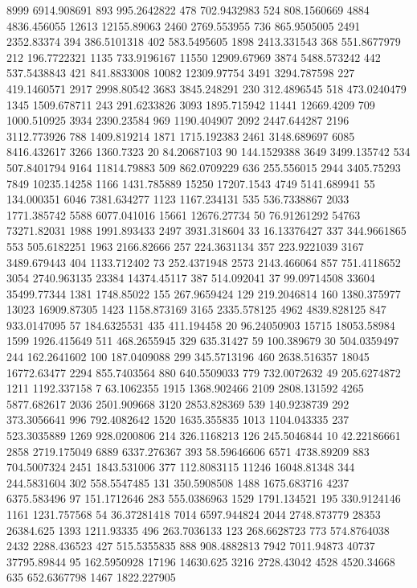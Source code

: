 8999	6914.908691
893	995.2642822
478	702.9432983
524	808.1560669
4884	4836.456055
12613	12155.89063
2460	2769.553955
736	865.9505005
2491	2352.83374
394	386.5101318
402	583.5495605
1898	2413.331543
368	551.8677979
212	196.7722321
1135	733.9196167
11550	12909.67969
3874	5488.573242
442	537.5438843
421	841.8833008
10082	12309.97754
3491	3294.787598
227	419.1460571
2917	2998.80542
3683	3845.248291
230	312.4896545
518	473.0240479
1345	1509.678711
243	291.6233826
3093	1895.715942
11441	12669.4209
709	1000.510925
3934	2390.23584
969	1190.404907
2092	2447.644287
2196	3112.773926
788	1409.819214
1871	1715.192383
2461	3148.689697
6085	8416.432617
3266	1360.7323
20	84.20687103
90	144.1529388
3649	3499.135742
534	507.8401794
9164	11814.79883
509	862.0709229
636	255.556015
2944	3405.75293
7849	10235.14258
1166	1431.785889
15250	17207.1543
4749	5141.689941
55	134.000351
6046	7381.634277
1123	1167.234131
535	536.7338867
2033	1771.385742
5588	6077.041016
15661	12676.27734
50	76.91261292
54763	73271.82031
1988	1991.893433
2497	3931.318604
33	16.13376427
337	344.9661865
553	505.6182251
1963	2166.82666
257	224.3631134
357	223.9221039
3167	3489.679443
404	1133.712402
73	252.4371948
2573	2143.466064
857	751.4118652
3054	2740.963135
23384	14374.45117
387	514.092041
37	99.09714508
33604	35499.77344
1381	1748.85022
155	267.9659424
129	219.2046814
160	1380.375977
13023	16909.87305
1423	1158.873169
3165	2335.578125
4962	4839.828125
847	933.0147095
57	184.6325531
435	411.194458
20	96.24050903
15715	18053.58984
1599	1926.415649
511	468.2655945
329	635.31427
59	100.389679
30	504.0359497
244	162.2641602
100	187.0409088
299	345.5713196
460	2638.516357
18045	16772.63477
2294	855.7403564
880	640.5509033
779	732.0072632
49	205.6274872
1211	1192.337158
7	63.1062355
1915	1368.902466
2109	2808.131592
4265	5877.682617
2036	2501.909668
3120	2853.828369
539	140.9238739
292	373.3056641
996	792.4082642
1520	1635.355835
1013	1104.043335
237	523.3035889
1269	928.0200806
214	326.1168213
126	245.5046844
10	42.22186661
2858	2719.175049
6889	6337.276367
393	58.59646606
6571	4738.89209
883	704.5007324
2451	1843.531006
377	112.8083115
11246	16048.81348
344	244.5831604
302	558.5547485
131	350.5908508
1488	1675.683716
4237	6375.583496
97	151.1712646
283	555.0386963
1529	1791.134521
195	330.9124146
1161	1231.757568
54	36.37281418
7014	6597.944824
2044	2748.873779
28353	26384.625
1393	1211.93335
496	263.7036133
123	268.6628723
773	574.8764038
2432	2288.436523
427	515.5355835
888	908.4882813
7942	7011.94873
40737	37795.89844
95	162.5950928
17196	14630.625
3216	2728.43042
4528	4520.34668
635	652.6367798
1467	1822.227905
